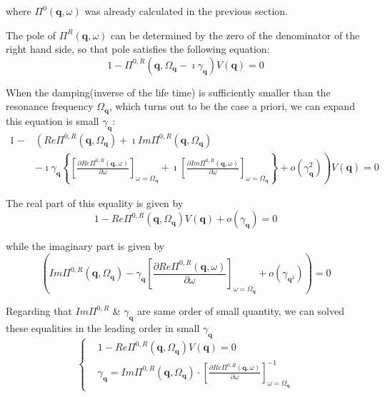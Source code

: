 where $\Pi^0(\mathbf{q},\omega)$ was already calculated in the previous section.

The pole of $\Pi^R(\mathbf{q},\omega)$ can be determined by the zero of the denominator of the right hand side, so that pole satisfies the following equation:
\begin{equation} \label{Eqs3.2.8}
1-\Pi^{0,R}(\mathbf{q},\Omega_{\mathbf{q}}-\imath \gamma_{\mathbf{q}})V(\mathbf{q}) = 0
\end{equation}

When the damping(inverse of the life time) is sufficiently smaller than the resonance frequency $\Omega_{\mathbf{q}}$, which turns out to be the case a priori, we can expand this equation is small $\gamma_{\mathbf{q}}$:
\begin{equation} \label{Eqs3.2.9} \begin{split}
1-&\left( Re\Pi^{0,R}(\mathbf{q},\Omega_{\mathbf{q}}) + \imath Im \Pi^{0,R}(\mathbf{q},\Omega_{\mathbf{q}}) \right.\\
&\left. -\imath \gamma_{\mathbf{q}} \left\{ \left[ \frac{\partial Re \Pi^{0,R}(\mathbf{q},\omega)}{\partial \omega} \right]_{\omega=\Omega_{\mathbf{q}}} + \imath \left[ \frac{\partial Im \Pi^{0,R}(\mathbf{q},\omega)}{\partial \omega} \right]_{\omega=\Omega_{\mathbf{q}}} \right\} + o(\gamma_{\mathbf{q}}^2) \right)V(\mathbf{q}) = 0
\end{split}\end{equation}

The real part of this equality is given by
\begin{equation} \label{Eqs3.2.10}
1- Re\Pi^{0,R}(\mathbf{q},\Omega_{\mathbf{q}}) V(\mathbf{q}) + o(\gamma_{\mathbf{q}}) = 0
\end{equation}

while the imaginary part is given by
\begin{equation} \label{Eqs3.2.11}
\left( Im \Pi^{0,R}(\mathbf{q},\Omega_{\mathbf{q}}) - \gamma_{\mathbf{q}} \left[ \frac{\partial Re \Pi^{0,R}(\mathbf{q},\omega)}{\partial \omega} \right]_{\omega=\Omega_{\mathbf{q}}} + o(\gamma_{\mathbf{q}^2}) \right) = 0
\end{equation}

Regarding that $Im \Pi^{0,R}$ \& $\gamma_{\mathbf{q}}$ are same order of small quantity, we can solved these equalities in the leading order in small $\gamma_{\mathbf{q}}$
\begin{equation} \label{Eqs3.2.12}
\left\{ \begin{split}
&1- Re\Pi^{0,R}(\mathbf{q},\Omega_{\mathbf{q}}) V(\mathbf{q}) = 0\\
&\gamma_{\mathbf{q}} = Im \Pi^{0,R}(\mathbf{q},\Omega_{\mathbf{q}}) \cdot 
 \left[ \frac{\partial Re \Pi^{0,R}(\mathbf{q},\omega)}{\partial \omega} \right]_{\omega=\Omega_{\mathbf{q}}}^{-1}
\end{split} \right.
\end{equation}

